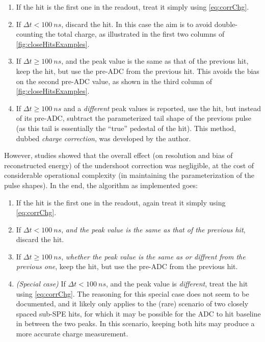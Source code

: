 \documentclass[../thesis.tex]{subfiles}
\begin{document}
\begin{enumerate}
\item If the hit is the first one in the readout, treat it simply using
  \eqref{eq:corrChg}.
\item If $\Delta t < \SI{100}{ns}$, discard the hit. In this case the aim is to
  avoid double-counting the total charge, as illustrated in the first two
  columns of \autoref{fig:closeHitsExamples}.
\item If $\Delta t \ge \SI{100}{ns}$, and the peak value is the same as that of
  the previous hit, keep the hit, but use the pre-ADC from the previous
  hit. This avoids the bias on the second pre-ADC value, as shown in the third
  column of \autoref{fig:closeHitsExamples}.
\item If $\Delta t \ge \SI{100}{ns}$ and a \emph{different} peak values is
  reported, use the hit, but instead of its pre-ADC, subtract the parameterized
  tail shape of the previous pulse (as this tail is essentially the ``true''
  pedestal of the hit). This method, dubbed \emph{charge correction}, was
  developed by the author.
\end{enumerate}

However, studies showed that the overall effect (on resolution and bias of
reconstructed energy) of the undershoot correction was negligible, at the cost
of considerable operational complexity (in maintaining the parameterization of
the pulse shapes). In the end, the algorithm as implemented goes:

\begin{enumerate}
\item If the hit is the first one in the readout, again treat it simply using
  \eqref{eq:corrChg}.
\item If $\Delta t < \SI{100}{ns}$, \emph{and the peak value is the same as that
    of the previous hit}, discard the hit.
\item If $\Delta t \ge \SI{100}{ns}$, \emph{whether the peak value is the same
    as or diffrent from the previous one}, keep the hit, but use the pre-ADC
  from the previous hit.
\item \emph{(Special case)} If $\Delta t < \SI{100}{ns}$, and the peak value is
  \emph{different}, treat the hit using \eqref{eq:corrChg}. The reasoning for
  this special case does not seem to be documented, and it likely only applies
  to the (rare) scenario of two closely spaced sub-SPE hits, for which it may be
  possible for the ADC to hit baseline in between the two peaks. In this
  scenario, keeping both hits may produce a more accurate charge measurement.
\end{enumerate}
\end{document}

